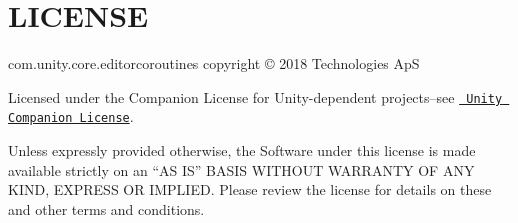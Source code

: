 \chapter{LICENSE}
\hypertarget{md__library_2_package_cache_2com_8unity_8editorcoroutines_0d1_80_80_2_l_i_c_e_n_s_e}{}\label{md__library_2_package_cache_2com_8unity_8editorcoroutines_0d1_80_80_2_l_i_c_e_n_s_e}
com.\+unity.\+core.\+editorcoroutines copyright © 2018  Technologies ApS

Licensed under the  Companion License for Unity-\/dependent projects--see \href{http://www.unity3d.com/legal/licenses/Unity_Companion_License}{\texttt{ Unity Companion License}}.

Unless expressly provided otherwise, the Software under this license is made available strictly on an “\+AS IS” BASIS WITHOUT WARRANTY OF ANY KIND, EXPRESS OR IMPLIED. Please review the license for details on these and other terms and conditions. 